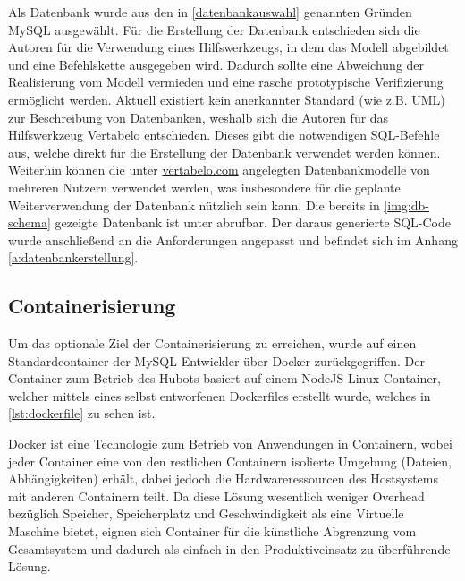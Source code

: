 

Als Datenbank wurde aus den in \autoref{datenbankauswahl} genannten Gründen MySQL ausgewählt.
Für die Erstellung der Datenbank entschieden sich die Autoren für die Verwendung eines Hilfswerkzeugs, in dem das Modell abgebildet und eine Befehlskette ausgegeben wird. Dadurch sollte eine Abweichung der Realisierung vom Modell vermieden und eine rasche prototypische Verifizierung ermöglicht werden. Aktuell existiert kein anerkannter Standard (wie z.B. UML) zur Beschreibung von Datenbanken, weshalb sich die Autoren für das Hilfswerkzeug Vertabelo entschieden. Dieses gibt die notwendigen SQL-Befehle aus, welche direkt für die Erstellung der Datenbank verwendet werden können. Weiterhin können die unter \url{vertabelo.com} angelegten Datenbankmodelle von mehreren Nutzern verwendet werden, was insbesondere für die geplante Weiterverwendung der Datenbank nützlich sein kann.
Die bereits in \autoref{img:db-schema} gezeigte Datenbank ist unter \cite{VertabeloDesignYourDatabase2018} abrufbar. Der daraus generierte SQL-Code wurde anschließend an die Anforderungen angepasst und befindet sich im Anhang  \autoref{a:datenbankerstellung}.


\subsection{Containerisierung}

Um das optionale Ziel der Containerisierung zu erreichen, wurde auf einen Standardcontainer der MySQL-Entwickler über Docker zurückgegriffen. Der Container zum Betrieb des Hubots basiert auf einem NodeJS Linux-Container, welcher mittels eines selbst entworfenen Dockerfiles erstellt wurde, welches in \autoref{lst:dockerfile} zu sehen ist.


Docker ist eine Technologie zum Betrieb von Anwendungen in Containern, wobei jeder Container eine von den restlichen Containern isolierte Umgebung (Dateien, \linebreak Abhängigkeiten) erhält, dabei jedoch die Hardwareressourcen des Hostsystems mit anderen Containern teilt. Da diese Lösung wesentlich weniger Overhead bezüglich Speicher, Speicherplatz und Geschwindigkeit als eine Virtuelle Maschine bietet, eignen sich Container für die künstliche Abgrenzung vom Gesamtsystem und dadurch als einfach in den Produktiveinsatz zu überführende Lösung.

